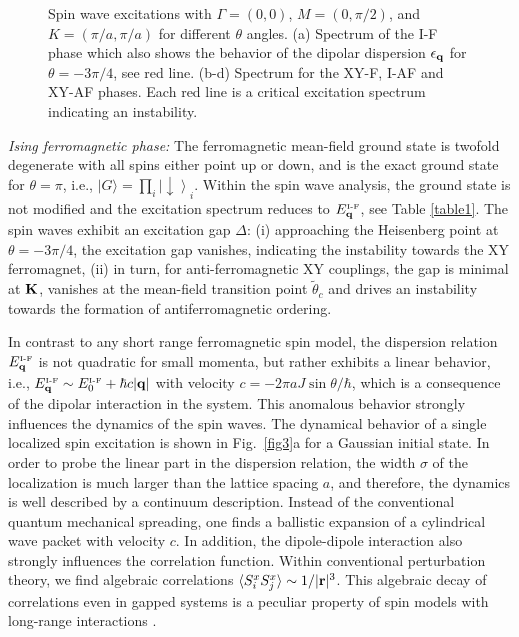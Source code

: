 \begin{figure}[ht]
  \caption{Spin wave excitations with $\Gamma=(0,0)$, $M=(0,\pi/2)$, and $K=(\pi/a,\pi/a)$ for different $\theta$ angles. (a) Spectrum of the I-F phase which also shows the behavior of the dipolar dispersion $\epsilon_{\bf q}$ for $\theta=-3\pi/4$, see red line. 
(b-d) Spectrum for the XY-F, I-AF and XY-AF phases. Each red line is a critical excitation spectrum indicating an instability.
  }\label{fig2}
\end{figure}




{\it Ising ferromagnetic phase:} 
The ferromagnetic mean-field ground state is twofold degenerate with all spins
either point up or down, and is the exact ground state for $\theta =	
\pi$, i.e., $|G\rangle = \prod_{i} \left|\downarrow \right\rangle_{i}$. Within the spin wave analysis,
the ground state is not modified and the excitation
spectrum reduces to $E_{{\bf q}}^{\mbox{\tiny I-F}}$, see Table \ref{table1}.
The spin waves exhibit an excitation gap $\Delta$: (i) approaching the
Heisenberg point at  $\theta = -3 \pi /4$, the excitation gap 
vanishes, indicating the instability towards the XY ferromagnet, (ii) in
turn, for anti-ferromagnetic XY couplings, the gap is minimal at  ${\bf K}$,
vanishes at the mean-field transition point $\tilde{\theta}_{c}$ and drives an instability towards the formation
of antiferromagnetic ordering.

In contrast to any short range ferromagnetic spin model, the
dispersion relation  $E_{{\bf q}}^{\mbox{\tiny I-F}}$ is not quadratic for small momenta,
but rather exhibits a linear behavior, i.e., $E_{{\bf q}}^{\mbox{\tiny I-F}}   \sim  E_{0}^{\mbox{\tiny I-F}}+ \hbar c |{\bf q}|$ with
velocity $c=  - 2 \pi a J \sin \theta  /\hbar$, which is a consequence of the dipolar interaction in
the system.  This anomalous behavior strongly influences the dynamics
of the spin waves. 
The dynamical behavior of a single localized spin excitation is shown in Fig.~\ref{fig3}a for a Gaussian initial state. 
In order to probe the linear part in the dispersion relation, the width $\sigma$ 
of the localization is much larger than the lattice spacing $a$, and therefore, the dynamics is
well described by a continuum description. 
Instead of the conventional quantum mechanical spreading, one finds  
a ballistic expansion of a cylindrical wave packet with velocity $c$. 
In addition, the dipole-dipole interaction also strongly influences the correlation function.
Within conventional perturbation theory, we find algebraic correlations $\langle S_{i}^{x} S_{j}^{x}\rangle \sim 1/|{\bf r}|^3$.
This algebraic decay of correlations even in gapped systems is a peculiar property of
spin models with long-range interactions  \cite{deng05,schuch06}.

